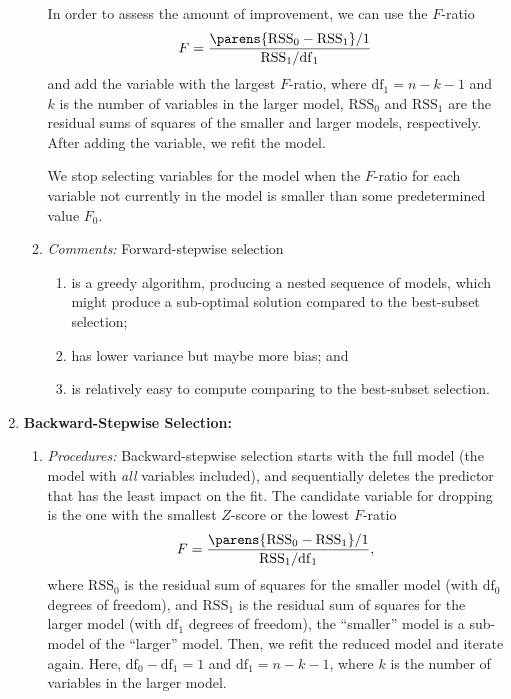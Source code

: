 \documentclass[12pt]{article}
\begin{document}
\begin{enumerate}[label=\textbf{\arabic*.}]
\begin{enumerate}
		In order to assess the amount of improvement, we can use the $F$-ratio 
		\begin{align*}
			F = \frac{\parens{\mathrm{RSS}_0 - \mathrm{RSS}_1} / 1}{\mathrm{RSS}_1 / \mathrm{df}_1}
		\end{align*}
		and add the variable with the largest $F$-ratio, where $\mathrm{df}_1 = n-k-1$ and $k$ is the number of variables in the larger model, $\mathrm{RSS}_0$ and $\mathrm{RSS}_1$ are the residual sums of squares of the smaller and larger models, respectively. After adding the variable, we refit the model. 
		
		We stop selecting variables for the model when the $F$-ratio for each variable not currently in the model is smaller than some predetermined value $F_0$. 
		
		\item \textit{Comments:} Forward-stepwise selection 
		\begin{enumerate}
			\item is a greedy algorithm, producing a nested sequence of models, which might produce a sub-optimal solution compared to the best-subset selection; 
			\item has lower variance but maybe more bias; and 
			\item is relatively easy to compute comparing to the best-subset selection. 
		\end{enumerate}
	\end{enumerate}
	
	\item \textbf{Backward-Stepwise Selection:} 
	\begin{enumerate}
		\item \textit{Procedures:} Backward-stepwise selection starts with the full model (the model with \emph{all} variables included), and sequentially deletes the predictor that has the least impact on the fit. The candidate variable for dropping is the one with the smallest $Z$-score or the lowest $F$-ratio 
		\begin{align*}
			F = \frac{\parens{\mathrm{RSS}_0 - \mathrm{RSS}_1} / 1}{\mathrm{RSS}_1 / \mathrm{df}_1}, 
		\end{align*}
		where $\mathrm{RSS}_0$ is the residual sum of squares for the smaller model (with $\mathrm{df}_0$ degrees of freedom), and $\mathrm{RSS}_1$ is the residual sum of squares for the larger model (with $\mathrm{df}_1$ degrees of freedom), the ``smaller'' model is a sub-model of the ``larger'' model. Then, we refit the reduced model and iterate again. Here, $\mathrm{df}_0 - \mathrm{df}_1 = 1$ and $\mathrm{df}_1 = n - k - 1$, where $k$ is the number of variables in the larger model. 
		

\end{enumerate}
\end{enumerate}
\end{document}
